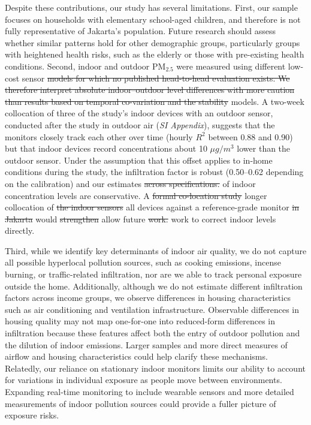 \documentclass[9pt,twocolumn,twoside]{pnas-new}
\providecommand{\DIFadd}[1]{{\protect\color{red}#1}}
\providecommand{\DIFdel}[1]{{\protect\color{red}\protect\sout{#1}}}
\begin{document}
Despite these contributions, our study has several limitations. First, our sample focuses on  households with elementary school-aged children, and therefore is not fully representative of Jakarta’s population. Future research should assess whether similar patterns hold for other demographic groups, particularly groups with heightened health risks, such as the elderly or those with pre-existing health conditions. 
Second, indoor and outdoor PM$_{2.5}$ were measured using different low-cost sensor \DIFdel{models for which no published head-to-head evaluation exists. We therefore interpret absolute indoor–outdoor level differences with more caution than results based on temporal co-variation and the stability} \DIFadd{models. A two-week collocation of three} of the \DIFadd{study's indoor devices with an outdoor sensor, conducted after the study in outdoor air (}\textit{\DIFadd{SI Appendix}}\DIFadd{), suggests that the monitors closely track each other over time (hourly $R^2$ between 0.88 and 0.90) but that indoor devices record concentrations about 10 $\mu g/m^3$ lower than the outdoor sensor. Under the assumption that this offset applies to in-home conditions during the study, the} infiltration \DIFadd{factor is robust (0.50--0.62 depending on the calibration) and our} estimates \DIFdel{across specifications.} \DIFadd{of indoor concentration levels are conservative.} A \DIFdel{formal co-location study} \DIFadd{longer collocation} of \DIFdel{the indoor sensors} \DIFadd{all devices} against a reference-grade monitor \DIFdel{in Jakarta} would \DIFdel{strengthen} \DIFadd{allow} future \DIFdel{work.} \DIFadd{work to correct indoor levels directly.}

Third, while we identify key determinants of indoor air quality, we do not capture all possible hyperlocal pollution sources, such as cooking emissions, incense burning, or traffic-related infiltration, nor are we able to track personal exposure outside the home. 
Additionally, although we do not estimate different infiltration factors across income groups, we observe differences in housing characteristics such as air conditioning and ventilation infrastructure. Observable differences in housing quality may not map one-for-one into reduced-form differences in infiltration because these features affect both the entry of outdoor pollution and the dilution of indoor emissions. Larger samples and more direct measures of airflow and housing characteristics could help clarify these mechanisms.
Relatedly, our reliance on stationary indoor monitors limits our ability to account for variations in individual exposure as people move between environments. Expanding real-time monitoring to include wearable sensors and more detailed measurements of indoor pollution sources could provide a fuller picture of exposure risks.
\end{document}
